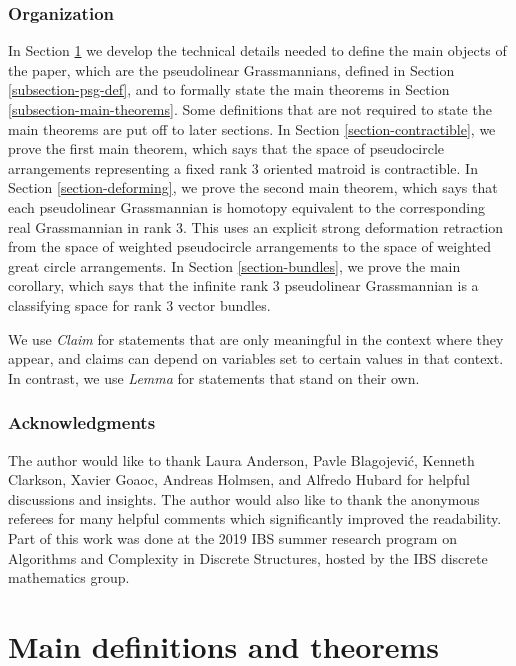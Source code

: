 \documentclass[JEP,XML,SOM,Unicode,NoFloatCountersInSection,published]{cedram}
\theoremstyle{remark}
\let\df\emph
\begin{document}
\subsubsection*{Organization}

In Section \ref{section-def} we develop the technical details needed to define the main objects of the paper, which are the pseudolinear Grassmannians, defined in Section \ref{subsection-psg-def}, and to formally state the main theorems in Section \ref{subsection-main-theorems}.
Some definitions that are not required to state the main theorems are put off to later sections.
In Section \ref{section-contractible}, we prove the first main theorem, which says that the space of pseudocircle arrangements representing a fixed rank $3$ oriented matroid is contractible.
In Section \ref{section-deforming}, we prove the second main theorem, which says that each pseudolinear Grassmannian is homotopy equivalent to the corresponding real Grassmannian in rank 3.
This uses an explicit strong deformation retraction from the space of weighted pseudocircle arrangements to the space of weighted great circle arrangements.
In Section \ref{section-bundles}, we prove the main corollary, which says that the infinite rank $3$ pseudolinear Grassmannian is a classifying space for rank $3$ vector bundles.

We use \df{Claim} for statements that are only meaningful in the context where they appear, and claims can depend on variables set to certain values in that context. In contrast, we use \df{Lemma} for statements that stand on their own.

\subsubsection*{Acknowledgments}

The author would like to thank
Laura Anderson,
Pavle Blagojević,
Kenneth Clarkson,
Xavier Goaoc,
Andreas Holmsen,
and Alfredo Hubard
for helpful discussions and insights.
The author would also like to thank the anonymous referees for many helpful comments which significantly improved the readability.
Part of this work was done at the 2019 IBS summer research program on Algorithms and Complexity in Discrete Structures, hosted by the IBS discrete mathematics group.

\section{Main definitions and theorems}\label{section-def}
\end{document}
